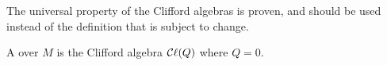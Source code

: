 \begin{remark}
  \label{mk:univ}

The universal property of the Clifford algebras is proven, and should be used instead of the definition
that is subject to change.

\end{remark}

\begin{definition}
  \label{ExteriorAlgebra}
  \leanok

  A  over $M$ is the Clifford algebra $\mathop{\mathcal{C}\ell}(Q)$ where $Q = 0$.

\end{definition}